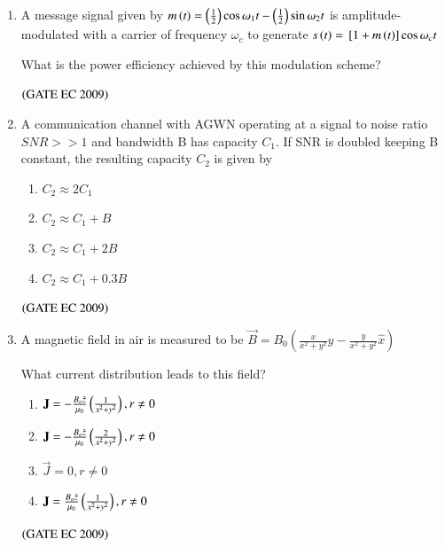 \documentclass[journal,12pt,onecolumn]{IEEEtran}
\theoremstyle{remark}
\begin{document}
\begin{enumerate}[start=1, label={Q\arabic*.}]
\item A message signal given by $m\left(t\right)=\left(\frac{1}{2}\right)\cos{\omega_1t}-\left(\frac{1}{2}\right)\sin{\omega_2t}$   is amplitude-modulated with a carrier of frequency $\omega_c$ to generate $s\left(t\right)={}\left[1+m\left(t\right)\right]\cos\omega_ct$ 

What is the power efficiency achieved by this modulation scheme?
\begin{enumerate}
\end{enumerate}
\hfill $\left(\text{GATE EC 2009}\right)$

\item A communication channel with AGWN operating at a signal to noise ratio $SNR>>1$ and bandwidth B has capacity $C_1$. If SNR is doubled keeping B constant, the resulting capacity $C_2$ is given by 
\begin{enumerate}
        \item $C_2 \approx 2 C_1$
        \item $C_2 \approx  C_1+B$
        \item $C_2 \approx  C_1 + 2B$
        \item $C_2 \approx  C_1+ 0.3B$
\end{enumerate}
\hfill $\left(\text{GATE EC 2009}\right)$

\item A magnetic field in air is measured to be $\vec{B} = B_0(\frac{x}{x^2+y^2} \hat{y} - \frac{y}{x^2+y^2} \hat{x})$

What current distribution leads to this field? 
\begin{enumerate}
        \item $\mathbf{J}= -\frac{B_o \hat{z}}{\mu_0} \left( \frac{1}{x^2 + y^2}\right), r \neq 0$
        \item $\mathbf{J}= -\frac{B_o \hat{z}}{\mu_0} \left( \frac{2}{x^2 + y^2}\right), r \neq 0$
        \item $\vec{J}= 0, r\neq 0$
        \item $\mathbf{J}= \frac{B_o \hat{z}}{\mu_0} \left( \frac{1}{x^2 + y^2}\right), r \neq 0$
\end{enumerate}
\hfill $\left(\text{GATE EC 2009}\right)$


\end{enumerate}
\end{document}
